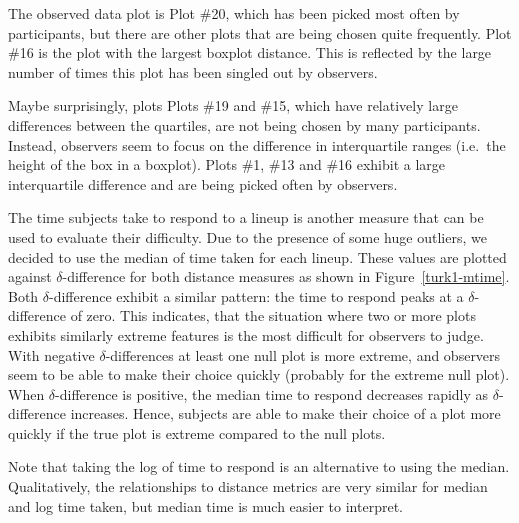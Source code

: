 \documentclass[12pt]{article}\usepackage[]{graphicx}\usepackage[]{color}
\newcommand{\hh}[1]{{\color{magenta} #1}}
\begin{document}
The observed data plot is Plot \#20, which has been picked most often by participants, but there are other plots that are being chosen quite frequently. Plot \#16 is the plot with the  largest boxplot distance. This is reflected by the large number of times this plot has been singled out by observers. 

Maybe surprisingly, plots Plots \#19 and \#15, which have relatively large differences between the quartiles, are not being chosen by many participants. Instead, observers seem to focus on the difference in interquartile ranges (i.e.\ the height of the box in a  boxplot). Plots \#1, \#13 and \#16 exhibit a large interquartile difference and are being picked often by observers.


The time subjects  take to respond to a lineup is another measure that can be used to evaluate their difficulty. 
Due to the presence of some huge outliers, we decided to use the median of time taken for each lineup. These values are plotted against  $\delta$-difference for both distance measures as shown in Figure~\ref{turk1-mtime}.
Both $\delta$-difference exhibit a similar pattern: the time to respond peaks at a $\delta$-difference of zero. This indicates, that the situation where two or more plots exhibits similarly extreme features is the most difficult for observers to judge. With negative $\delta$-differences at least one null plot is more extreme, and observers seem to be able to make their choice quickly (probably for the extreme null plot).
When $\delta$-difference is positive, the median time to respond decreases rapidly as $\delta$-difference increases. Hence, subjects are able to make their choice of a plot more quickly if the true plot is extreme compared to the null plots.

Note that taking the log of time to respond is an alternative to using the median. Qualitatively, the relationships to distance metrics are very similar for median and log time taken, but median time is much easier to interpret. 
\end{document}
